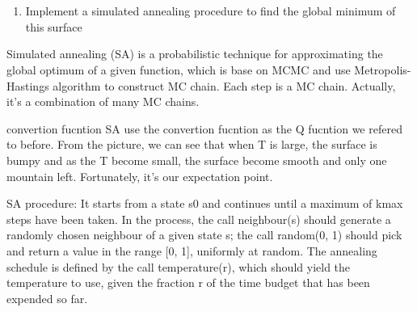 \documentclass[11pt]{article}
\providecommand{\tightlist}{%
      \setlength{\itemsep}{0pt}\setlength{\parskip}{0pt}}
\begin{document}
    \begin{center}
    \end{center}
    { \hspace*{\fill} \\}
    
    \begin{center}
    \end{center}
    { \hspace*{\fill} \\}
    
    \begin{enumerate}
\def\labelenumi{\roman{enumi}.}
\setcounter{enumi}{1}
\tightlist
\item
  Implement a simulated annealing procedure to find the global minimum
  of this surface
\end{enumerate}

Simulated annealing (SA) is a probabilistic technique for approximating
the global optimum of a given function, which is base on MCMC and use
Metropolis-Hastings algorithm to construct MC chain. Each step is a MC
chain. Actually, it's a combination of many MC chains.

convertion fucntion SA use the convertion fucntion as the Q fucntion we
refered to before. From the picture, we can see that when T is large,
the surface is bumpy and as the T become small, the surface become
smooth and only one mountain left. Fortunately, it's our expectation
point.

SA procedure: It starts from a state s0 and continues until a maximum of
kmax steps have been taken. In the process, the call neighbour(s) should
generate a randomly chosen neighbour of a given state s; the call
random(0, 1) should pick and return a value in the range {[}0, 1{]},
uniformly at random. The annealing schedule is defined by the call
temperature(r), which should yield the temperature to use, given the
fraction r of the time budget that has been expended so far.
\end{document}
